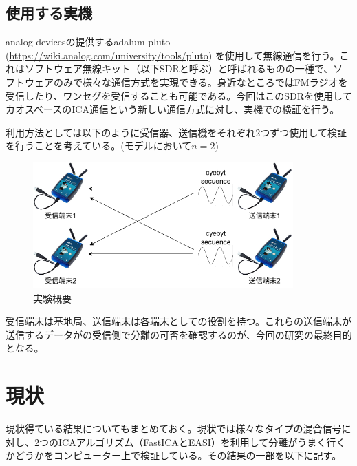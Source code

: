 \documentclass{jsarticle}
\begin{document}
\subsection{使用する実機}
analog devicesの提供するadalum-pluto
(\url{https://wiki.analog.com/university/tools/pluto})
を使用して無線通信を行う。これはソフトウェア無線キット（以下SDRと呼ぶ）と呼ばれるものの一種で、ソフトウェアのみで様々な通信方式を実現できる。身近なところではFMラジオを受信したり、ワンセグを受信することも可能である。今回はこのSDRを使用してカオスベースのICA通信という新しい通信方式に対し、実機での検証を行う。

利用方法としては以下のように受信器、送信機をそれぞれ2つずつ使用して検証を行うことを考えている。(モデルにおいて$n=2$)

\begin{figure}[!htbp]
    \begin{center}
        \includegraphics[width=10cm]{img/3device.png}
        \caption{実験概要}
        \label{img:3device}
    \end{center}
\end{figure}

受信端末は基地局、送信端末は各端末としての役割を持つ。これらの送信端末が送信するデータがの受信側で分離の可否を確認するのが、今回の研究の最終目的となる。

\section{現状}
現状得ている結果についてもまとめておく。現状では様々なタイプの混合信号に対し、2つのICAアルゴリズム（FastICA\cite{fastica}とEASI\cite{easi}）を利用して分離がうまく行くかどうかをコンピューター上で検証している。その結果の一部を以下に記す。
\end{document}
